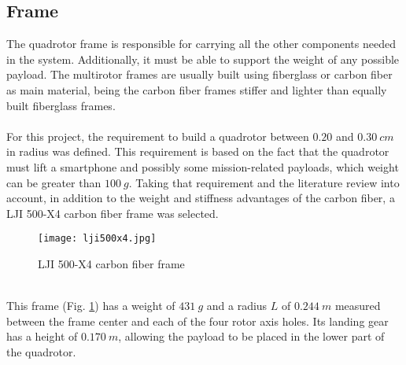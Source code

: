 \subsection{Frame}
The quadrotor frame is responsible for carrying all the other components needed in the system. Additionally, it must be able to support the weight of any possible payload. The multirotor frames are usually built using fiberglass or carbon fiber as main material, being the carbon fiber frames stiffer and lighter than equally built fiberglass frames.
\\\\
For this project, the requirement to build a quadrotor between $0.20$ and $0.30\ cm$ in radius was defined. This requirement is based on the fact that the quadrotor must lift a smartphone and possibly some mission-related payloads, which weight can be greater than $100\ g$. Taking that requirement and the literature review into account, in addition to the weight and stiffness advantages of the carbon fiber, a LJI 500-X4 carbon fiber frame was selected.
\begin{figure}[h]
\begin{center}
\texttt{[image: lji500x4.jpg]}    
\caption[LJI 500-X4 carbon fiber frame]{LJI 500-X4 carbon fiber frame\protect\footnotemark} 
\label{fig:quadframe}
\end{center}
\end{figure}
\\
This frame (Fig. \ref{fig:quadframe}) has a weight of $431\ g$ and a radius $L$ of $0.244\ m$ measured between the frame center and each of the four rotor axis holes. Its landing gear has a height of $0.170\ m$, allowing the payload to be placed in the lower part of the quadrotor.

